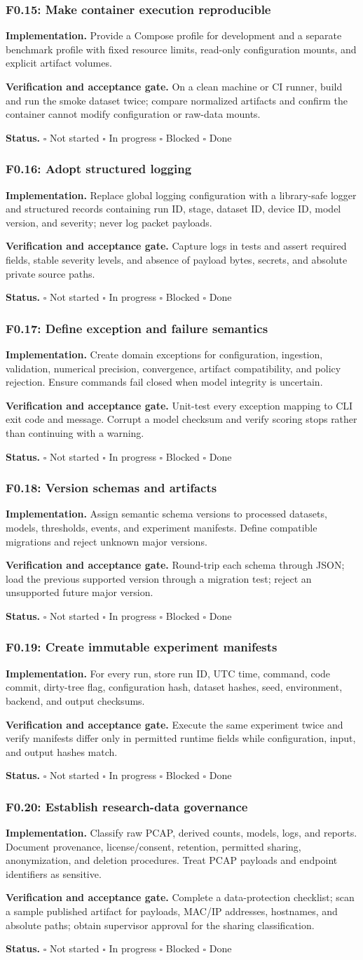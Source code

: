 \documentclass[11pt,a4paper]{article}
\newcommand{\status}{\(\square\) Not started \quad \(\square\) In progress \quad \(\square\) Blocked \quad \(\square\) Done}
\newcommand{\task}[4]{%
  \subsubsection{#1: #2}
  \textbf{Implementation.} #3

  \textbf{Verification and acceptance gate.} #4

  \textbf{Status.} \status
}
\begin{document}
\task{F0.15}{Make container execution reproducible}{Provide a Compose profile for development and a separate benchmark profile with fixed resource limits, read-only configuration mounts, and explicit artifact volumes.}{On a clean machine or CI runner, build and run the smoke dataset twice; compare normalized artifacts and confirm the container cannot modify configuration or raw-data mounts.}

\task{F0.16}{Adopt structured logging}{Replace global logging configuration with a library-safe logger and structured records containing run ID, stage, dataset ID, device ID, model version, and severity; never log packet payloads.}{Capture logs in tests and assert required fields, stable severity levels, and absence of payload bytes, secrets, and absolute private source paths.}

\task{F0.17}{Define exception and failure semantics}{Create domain exceptions for configuration, ingestion, validation, numerical precision, convergence, artifact compatibility, and policy rejection. Ensure commands fail closed when model integrity is uncertain.}{Unit-test every exception mapping to CLI exit code and message. Corrupt a model checksum and verify scoring stops rather than continuing with a warning.}

\task{F0.18}{Version schemas and artifacts}{Assign semantic schema versions to processed datasets, models, thresholds, events, and experiment manifests. Define compatible migrations and reject unknown major versions.}{Round-trip each schema through JSON; load the previous supported version through a migration test; reject an unsupported future major version.}

\task{F0.19}{Create immutable experiment manifests}{For every run, store run ID, UTC time, command, code commit, dirty-tree flag, configuration hash, dataset hashes, seed, environment, backend, and output checksums.}{Execute the same experiment twice and verify manifests differ only in permitted runtime fields while configuration, input, and output hashes match.}

\task{F0.20}{Establish research-data governance}{Classify raw PCAP, derived counts, models, logs, and reports. Document provenance, license/consent, retention, permitted sharing, anonymization, and deletion procedures. Treat PCAP payloads and endpoint identifiers as sensitive.}{Complete a data-protection checklist; scan a sample published artifact for payloads, MAC/IP addresses, hostnames, and absolute paths; obtain supervisor approval for the sharing classification.}
\end{document}
